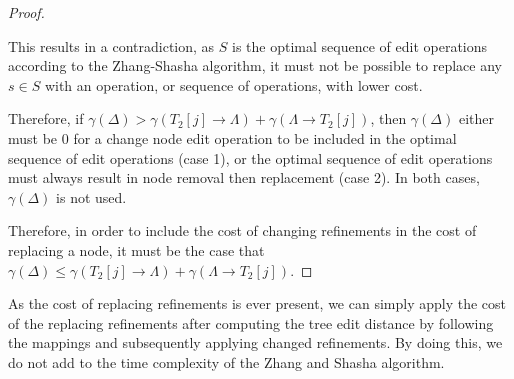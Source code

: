 \begin{lemma}
\begin{proof}
\begin{enumerate}
This results in a contradiction, as $S$ is the optimal sequence of edit operations according to the Zhang-Shasha algorithm, it must not be possible to replace any $s \in S$ with an operation, or sequence of operations, with lower cost.
\end{enumerate}

Therefore, if $\gamma(\Delta) > \gamma(T_2[j] \rightarrow {\Lambda}) + \gamma(\Lambda \rightarrow {T_2[j]})$, then $\gamma(\Delta)$ either must be 0 for a change node edit operation to be included in the optimal sequence of edit operations (case 1), or the optimal sequence of edit operations must always result in node removal then replacement (case 2). In both cases, $\gamma(\Delta)$ is not used. 

Therefore, in order to include the cost of changing refinements in the cost of replacing a node, it must be the case that $\gamma(\Delta) \le \gamma(T_2[j] \rightarrow {\Lambda}) + \gamma(\Lambda \rightarrow {T_2[j]})$.


\end{proof}


\end{lemma}






As the cost of replacing refinements is ever present, we can simply apply the cost of the replacing refinements after computing the tree edit distance by following the mappings and subsequently applying changed refinements. By doing this, we do not add to the time complexity of the Zhang and Shasha algorithm.

